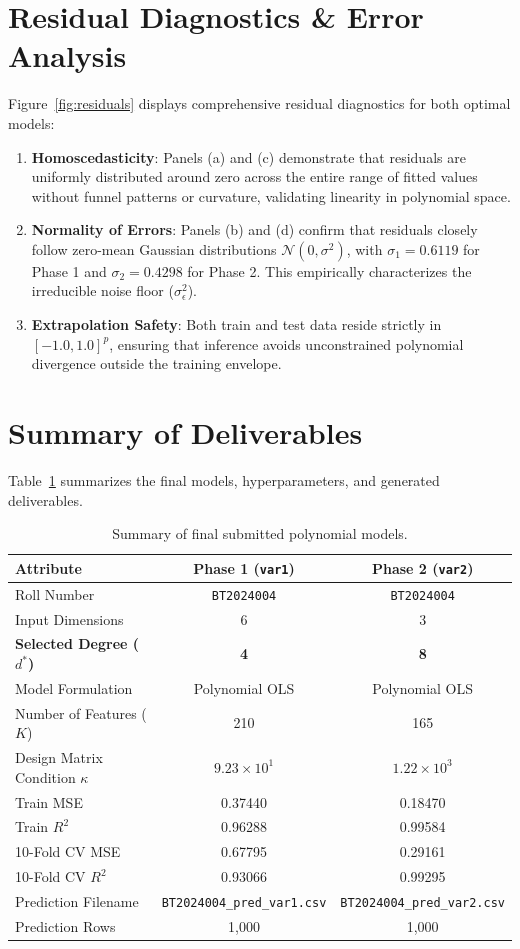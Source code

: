 \documentclass[10pt,twocolumn,a4paper]{article}
\begin{document}
\section{Residual Diagnostics \& Error Analysis}
Figure~\ref{fig:residuals} displays comprehensive residual diagnostics for both optimal models:
\begin{enumerate}
    \item \textbf{Homoscedasticity}: Panels (a) and (c) demonstrate that residuals are uniformly distributed around zero across the entire range of fitted values without funnel patterns or curvature, validating linearity in polynomial space.
    \item \textbf{Normality of Errors}: Panels (b) and (d) confirm that residuals closely follow zero-mean Gaussian distributions $\mathcal{N}(0, \sigma^2)$, with $\sigma_1 = 0.6119$ for Phase 1 and $\sigma_2 = 0.4298$ for Phase 2. This empirically characterizes the irreducible noise floor ($\sigma_\epsilon^2$).
    \item \textbf{Extrapolation Safety}: Both train and test data reside strictly in $[-1.0, 1.0]^p$, ensuring that inference avoids unconstrained polynomial divergence outside the training envelope.
\end{enumerate}

\section{Summary of Deliverables}
Table~\ref{tab:final_summary} summarizes the final models, hyperparameters, and generated deliverables.

\begin{table}[h]
\centering
\small
\caption{Summary of final submitted polynomial models.}
\label{tab:final_summary}
\begin{tabular}{lcc}
\toprule
\textbf{Attribute} & \textbf{Phase 1 (\texttt{var1})} & \textbf{Phase 2 (\texttt{var2})} \\
\midrule
Roll Number & \texttt{BT2024004} & \texttt{BT2024004} \\
Input Dimensions & 6 & 3 \\
\textbf{Selected Degree ($d^*$)} & \textbf{4} & \textbf{8} \\
Model Formulation & Polynomial OLS & Polynomial OLS \\
Number of Features ($K$) & 210 & 165 \\
Design Matrix Condition $\kappa$ & $9.23 \times 10^1$ & $1.22 \times 10^3$ \\
Train MSE & 0.37440 & 0.18470 \\
Train $R^2$ & 0.96288 & 0.99584 \\
10-Fold CV MSE & 0.67795 & 0.29161 \\
10-Fold CV $R^2$ & 0.93066 & 0.99295 \\
Prediction Filename & \texttt{BT2024004\_pred\_var1.csv} & \texttt{BT2024004\_pred\_var2.csv} \\
Prediction Rows & 1,000 & 1,000 \\
\bottomrule
\end{tabular}
\end{table}
\end{document}
